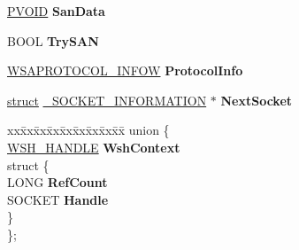 \begin{DoxyCompactItemize}
\hyperlink{interfacevoid}{P\+V\+O\+ID} {\bfseries San\+Data}
\item 
\mbox{\label{struct___s_o_c_k_e_t___i_n_f_o_r_m_a_t_i_o_n_a98d4d0af372c29337b3622f8505f5c3a}} 
B\+O\+OL {\bfseries Try\+S\+AN}
\item 
\mbox{\label{struct___s_o_c_k_e_t___i_n_f_o_r_m_a_t_i_o_n_afa7ae5ec8b63eba4a2ec59d9ddc352eb}} 
\hyperlink{struct___w_s_a_p_r_o_t_o_c_o_l___i_n_f_o_w}{W\+S\+A\+P\+R\+O\+T\+O\+C\+O\+L\+\_\+\+I\+N\+F\+OW} {\bfseries Protocol\+Info}
\item 
\mbox{\label{struct___s_o_c_k_e_t___i_n_f_o_r_m_a_t_i_o_n_a463f4c1ffb1f70631a6cfe7b2c2e70e1}} 
\hyperlink{interfacestruct}{struct} \hyperlink{struct___s_o_c_k_e_t___i_n_f_o_r_m_a_t_i_o_n}{\+\_\+\+S\+O\+C\+K\+E\+T\+\_\+\+I\+N\+F\+O\+R\+M\+A\+T\+I\+ON} $\ast$ {\bfseries Next\+Socket}
\item 
\mbox{\label{struct___s_o_c_k_e_t___i_n_f_o_r_m_a_t_i_o_n_a9bf5740b60f1d07623efe47300c7428a}} 
\begin{tabbing}
xx\=xx\=xx\=xx\=xx\=xx\=xx\=xx\=xx\=\kill
union \{\\
\>\hyperlink{struct___w_s_h___h_a_n_d_l_e}{WSH\_HANDLE} {\bfseries WshContext}\\
\mbox{\label{union___s_o_c_k_e_t___i_n_f_o_r_m_a_t_i_o_n_1_1_0D3199_a640780ec68d815cefa24252164fdfa68}} 
\>struct \{\\
\>\>LONG {\bfseries RefCount}\\
\>\>SOCKET {\bfseries Handle}\\
\>\} \\
\}; \\


\end{tabbing}
\end{DoxyCompactItemize}
